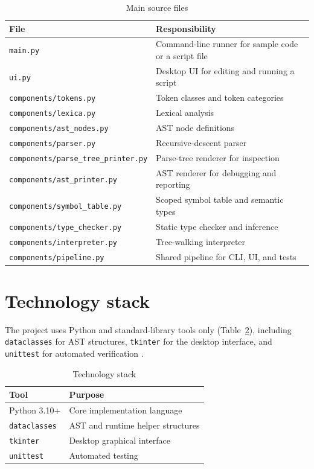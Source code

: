 \begin{table}[H]
\centering
\caption{Main source files}
\label{tab:main-source-files}
\begin{tabular}{>{\raggedright\arraybackslash}p{}>{\raggedright\arraybackslash}p{}}
\toprule
File & Responsibility \\
\midrule
\texttt{main.py} & Command-line runner for sample code or a script file \\
\texttt{ui.py} & Desktop UI for editing and running a script \\
\texttt{components/tokens.py} & Token classes and token categories \\
\texttt{components/lexica.py} & Lexical analysis \\
\texttt{components/ast\_nodes.py} & AST node definitions \\
\texttt{components/parser.py} & Recursive-descent parser \\
\texttt{components/parse\_tree\_printer.py} & Parse-tree renderer for inspection \\
\texttt{components/ast\_printer.py} & AST renderer for debugging and reporting \\
\texttt{components/symbol\_table.py} & Scoped symbol table and semantic types \\
\texttt{components/type\_checker.py} & Static type checker and inference \\
\texttt{components/interpreter.py} & Tree-walking interpreter \\
\texttt{components/pipeline.py} & Shared pipeline for CLI, UI, and tests \\
\bottomrule
\end{tabular}
\end{table}

\section{Technology stack}
The project uses Python and standard-library tools only
(Table~\ref{tab:technology-stack}), including \texttt{dataclasses} for AST
structures, \texttt{tkinter} for the desktop interface, and \texttt{unittest}
for automated verification \citep{pythonDocsDataclasses,pythonDocsTkinter,pythonDocsUnittest}.

\begin{table}[H]
\centering
\caption{Technology stack}
\label{tab:technology-stack}
\begin{tabular}{ll}
\toprule
Tool & Purpose \\
\midrule
Python 3.10+ & Core implementation language \\
\texttt{dataclasses} & AST and runtime helper structures \\
\texttt{tkinter} & Desktop graphical interface \\
\texttt{unittest} & Automated testing \\
\bottomrule
\end{tabular}
\end{table}

